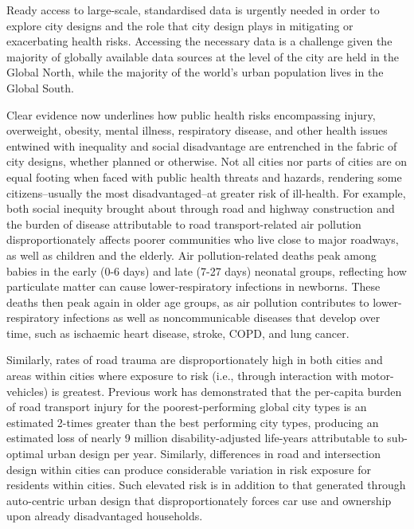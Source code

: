 \documentclass[preprint,12pt]{elsarticle}
\begin{document}
Ready access to large-scale, standardised data is urgently needed in order to explore city designs and the role that city design plays in mitigating or exacerbating health risks. Accessing the necessary data is a challenge given the majority of globally available data sources at the level of the city are held in the Global North, while the majority of the world's urban population lives in the Global South\cite{Smit2021}.

Clear evidence now underlines how public health risks encompassing injury, overweight, obesity, mental illness, respiratory disease, and other health issues entwined with inequality and social disadvantage are entrenched in the fabric of city designs, whether planned or otherwise\cite{borrell2013factors,xing2016impact,yuchi2020road}. Not all cities nor parts of cities are on equal footing when faced with public health threats and hazards, rendering some citizens--usually the most disadvantaged--at greater risk of ill-health\cite{KRISHNA2021102046}. For example, both social inequity brought about through road and highway construction\cite{carpenter2010poverty,archer2020white} and the burden of disease attributable to road transport-related air pollution disproportionately affects poorer communities who live close to major roadways, as well as children and the elderly. Air pollution-related deaths peak among babies in the early (0-6 days) and late (7-27 days) neonatal groups, reflecting how particulate matter can cause lower-respiratory infections in newborns. These deaths then peak again in older age groups, as air pollution contributes to lower-respiratory infections as well as noncommunicable diseases that develop over time, such as ischaemic heart disease, stroke, COPD, and lung cancer\cite{boogaard2022long}. 

Similarly, rates of road trauma are disproportionately high in both cities and areas within cities where exposure to risk (i.e., through interaction with motor-vehicles) is greatest. Previous work has demonstrated that the per-capita burden of road transport injury for the poorest-performing global city types is an estimated 2-times greater than the best performing city types, producing an estimated loss of nearly 9 million disability-adjusted life-years attributable to sub-optimal urban design per year\cite{Thompson2020}. Similarly, differences in road and intersection design within cities can produce considerable variation in risk exposure for residents within cities\cite{Wijnands_IntersectionDesign2021,MORRISON2019123}. Such elevated risk is in addition to that generated through auto-centric urban design that disproportionately forces car use and ownership upon already disadvantaged households\cite{currie2018alarming, CURL201861}. 
\end{document}
